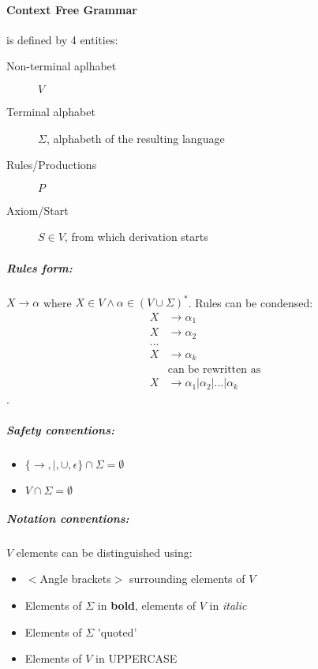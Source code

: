 \documentclass{article}
\begin{document}
\paragraph{Context Free Grammar} is defined by 4 entities:
\begin{description}
\item[Non-terminal aplhabet] $V$
\item[Terminal alphabet] $\Sigma$, alphabeth of the resulting language
\item[Rules/Productions] $P$
\item[Axiom/Start] $S\in V$, from which derivation starts
\end{description}
\subparagraph{Rules form: }$X \rightarrow \alpha$ where $X \in V \wedge \alpha \in (V \cup \Sigma)^*$. Rules can be condensed:
\begin{align*}
X &\rightarrow \alpha_1\\
X &\rightarrow \alpha_2\\
...\\
X &\rightarrow \alpha_k\\
&\text{can be rewritten as}\\
X &\rightarrow \alpha_1 | \alpha_2 | ... | \alpha_k
\end{align*}.
\subparagraph{Safety conventions:}
\begin{itemize}
\item $\{\rightarrow, |, \cup, \epsilon\} \cap \Sigma = \emptyset$
\item $V \cap \Sigma = \emptyset$
\end{itemize}
\subparagraph{Notation conventions:}
$V$ elements can be distinguished using:
\begin{itemize}
\item $<$Angle brackets$>$ surrounding elements of $V$
\item Elements of $\Sigma$ in \textbf{bold}, elements of $V$ in \textit{italic}
\item Elements of $\Sigma$ 'quoted'
\item Elements of $V$ in UPPERCASE
\end{itemize}
\end{document}
